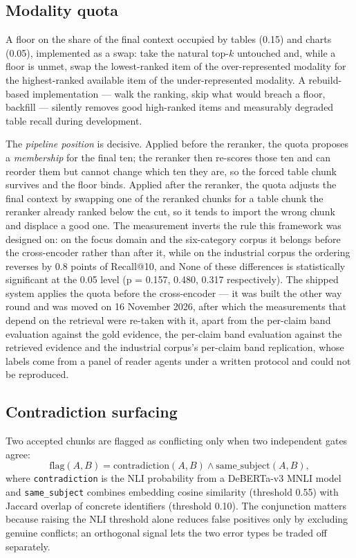 \documentclass[preprint,3p,times]{elsarticle}
\begin{document}
\subsection{Modality quota}

A floor on the share of the final context occupied by tables (0.15) and charts
(0.05), implemented as a swap: take the natural top-$k$ untouched and, while a
floor is unmet, swap the lowest-ranked item of the over-represented modality
for the highest-ranked available item of the under-represented modality. A
rebuild-based implementation --- walk the ranking, skip what would breach a
floor, backfill --- silently removes good high-ranked items and measurably
degraded table recall during development.

The \emph{pipeline position} is decisive. Applied before the reranker, the
quota proposes a \emph{membership} for the final ten; the reranker then
re-scores those ten and can reorder them but cannot change which ten they are,
so the forced table chunk survives and the floor binds. Applied after the
reranker, the quota adjusts the final context by swapping one of the reranked
chunks for a table chunk the reranker already ranked below the cut, so it
tends to import the wrong chunk and displace a good one. The measurement inverts the rule this framework was designed on:
on the focus domain and the six-category corpus it belongs before the cross-encoder rather than after it, while on the industrial corpus the ordering reverses by 0.8 points of Recall@10, and None of these differences is statistically significant at the 0.05 level (p = 0.157, 0.480, 0.317 respectively). The shipped system applies
the quota before the cross-encoder --- it was built the other way round and
was moved on 16 November 2026, after which
the measurements that depend on the retrieval were re-taken with it, apart from the per-claim band evaluation against the gold evidence, the per-claim band evaluation against the retrieved evidence and the industrial corpus's per-claim band replication, whose labels come from a panel of reader agents under a written protocol and could not be reproduced.

\subsection{Contradiction surfacing}

Two accepted chunks are flagged as conflicting only when two independent gates
agree:
\begin{equation}
\mathrm{flag}(A,B)=\mathrm{contradiction}(A,B)\wedge\mathrm{same\_subject}(A,B),
\end{equation}
where \texttt{contradiction} is the NLI probability from a DeBERTa-v3 MNLI
model and \texttt{same\_subject} combines embedding cosine similarity
(threshold 0.55) with Jaccard overlap of concrete identifiers (threshold 0.10).
The conjunction matters because raising the NLI threshold alone reduces false
positives only by excluding genuine conflicts; an orthogonal signal lets the two
error types be traded off separately.
\end{document}
